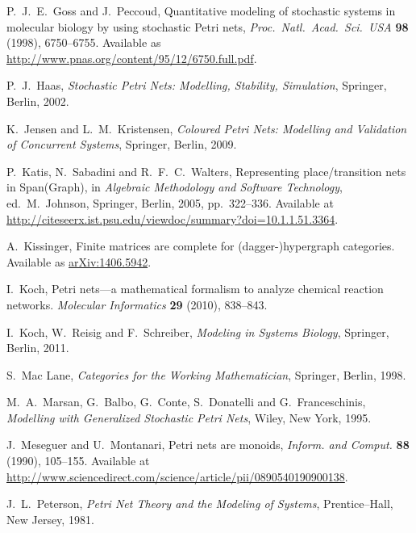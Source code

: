\documentclass{compositionalityarticle}
\theoremstyle{compositionality}
\theoremstyle{remark}
\begin{document}
\begin{thebibliography}{9}
 P.\ J.\ E.\ Goss and J.\ Peccoud, Quantitative modeling of stochastic systems in molecular biology by using stochastic Petri nets, \textsl{Proc.\ Natl.\ Acad.\ Sci.\ USA} \textbf{98} (1998), 6750--6755.  Available as \href{http://www.pnas.org/content/95/12/6750.full.pdf}{http://www.pnas.org/content/95/12/6750.full.pdf}.

 P.\ J.\ Haas, \textsl{Stochastic Petri Nets: Modelling, Stability, Simulation}, Springer, Berlin, 2002.

 K.\ Jensen and L.\ M.\ Kristensen, \textsl{Coloured Petri Nets: Modelling and Validation of Concurrent Systems}, Springer, Berlin, 2009.

 P.\ Katis, N.\ Sabadini and R.\ F.\ C.\ Walters, Representing place/transition nets in Span(Graph), in \textsl{Algebraic Methodology and Software Technology}, ed.\ M.\ Johnson, Springer, Berlin, 2005, pp.\ 322--336.  Available at \href{http://citeseerx.ist.psu.edu/viewdoc/summary?doi=10.1.1.51.3364}{http://citeseerx.ist.psu.edu/viewdoc/summary?doi=10.1.1.51.3364}.

 A.\ Kissinger, Finite matrices are complete for (dagger-)hypergraph categories.  Available as \href{http://arxiv.org/abs/1406.5942}{arXiv:1406.5942}.

 I.\ Koch, Petri nets---a mathematical formalism to analyze 
chemical reaction networks. \textsl{Molecular Informatics} \textbf{29} (2010),
838--843.

 I.\ Koch, W.\ Reisig and F.\ Schreiber, \textsl{Modeling
in Systems Biology}, Springer, Berlin, 2011.

 S.\ Mac Lane, \textsl{Categories for the Working Mathematician},
Springer, Berlin, 1998.

M.\ A.\ Marsan, G.\ Balbo, G.\ Conte, S.\ Donatelli and G.\ Franceschinis,
\textsl{Modelling with Generalized Stochastic Petri Nets}, Wiley, New York, 1995.

 J.\ Meseguer and U.\ Montanari, Petri nets are monoids, \textsl{Inform. and Comput.} \textbf{88} (1990), 105--155. Available at \href{http://www.sciencedirect.com/science/article/pii/0890540190900138}{http://www.sciencedirect.com/science/article/pii/0890540190900138}.

J.\ L.\ Peterson, \textit{Petri Net Theory and the Modeling of Systems}, 
Prentice--Hall, New Jersey, 1981.  


\end{thebibliography}
\end{document}
